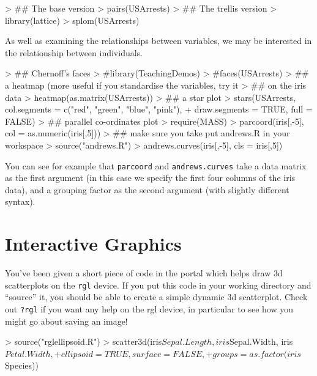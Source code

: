 \documentclass[11pt]{article}
\begin{document}
\begin{Schunk}
\begin{Sinput}
> ## The base version
> pairs(USArrests)
> ## The trellis version
> library(lattice)
> splom(USArrests)
\end{Sinput}
\end{Schunk}


As well as examining the relationships between variables, we may be interested in the relationship between individuals.

\begin{Schunk}
\begin{Sinput}
> ## Chernoff's faces
> #library(TeachingDemos)
> #faces(USArrests)
> ## a heatmap (more useful if you standardise the variables, try it
> ## on the iris data
> heatmap(as.matrix(USArrests))
> ## a star plot
> stars(USArrests, col.segments = c("red", "green", "blue", "pink"), 
+   draw.segments = TRUE, full = FALSE)
> ## parallel co-ordinates plot
> require(MASS)
> parcoord(iris[,-5], col = as.numeric(iris[,5]))
> ## make sure you take put andrews.R in your workspace
> source("andrews.R")
> andrews.curves(iris[,-5], cls = iris[,5])
\end{Sinput}
\end{Schunk}

You can see for example that \texttt{parcoord} and \texttt{andrews.curves} take a data matrix as the first argument (in this case we specify the first four columns of the iris data), and a grouping factor as the second argument (with slightly different syntax).


\section{Interactive Graphics}

You've been given a short piece of code in the portal which helps draw 3d scatterplots on the \texttt{rgl} device.   If you put this code in your working directory and ``source'' it, you should be able to create a simple dynamic 3d scatterplot.   Check out \texttt{?rgl} if you want any help on the rgl device, in particular to see how you might go about saving an image!

\begin{Schunk}
\begin{Sinput}
> source("rglellipsoid.R")
> scatter3d(iris$Sepal.Length, iris$Sepal.Width, iris$Petal.Width,
+            ellipsoid=TRUE, surface=FALSE,
+            groups=as.factor(iris$Species))
\end{Sinput}
\end{Schunk}
\end{document}
